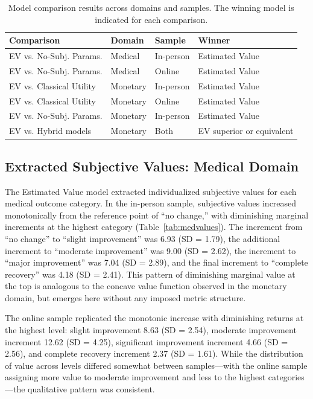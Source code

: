 \documentclass[12pt]{article}
\begin{document}
\begin{table}[ht]
\centering
\caption{Model comparison results across domains and samples. The winning model is indicated for each comparison.}
\label{tab:modelcomp}
\begin{tabular}{llll}
\toprule
Comparison & Domain & Sample & Winner \\
\midrule
EV vs. No-Subj. Params. & Medical & In-person & Estimated Value \\
EV vs. No-Subj. Params. & Medical & Online & Estimated Value \\
EV vs. Classical Utility & Monetary & In-person & Estimated Value \\
EV vs. Classical Utility & Monetary & Online & Estimated Value \\
EV vs. No-Subj. Params. & Monetary & In-person & Estimated Value \\
EV vs. Hybrid models & Monetary & Both & EV superior or equivalent \\
\bottomrule
\end{tabular}
\end{table}

\subsection{Extracted Subjective Values: Medical Domain}

The Estimated Value model extracted individualized subjective values for each medical outcome category. In the in-person sample, subjective values increased monotonically from the reference point of ``no change,'' with diminishing marginal increments at the highest category (Table~\ref{tab:medvalues}). The increment from ``no change'' to ``slight improvement'' was 6.93 (SD = 1.79), the additional increment to ``moderate improvement'' was 9.00 (SD = 2.62), the increment to ``major improvement'' was 7.04 (SD = 2.89), and the final increment to ``complete recovery'' was 4.18 (SD = 2.41). This pattern of diminishing marginal value at the top is analogous to the concave value function observed in the monetary domain, but emerges here without any imposed metric structure.

The online sample replicated the monotonic increase with diminishing returns at the highest level: slight improvement 8.63 (SD = 2.54), moderate improvement increment 12.62 (SD = 4.25), significant improvement increment 4.66 (SD = 2.56), and complete recovery increment 2.37 (SD = 1.61). While the distribution of value across levels differed somewhat between samples---with the online sample assigning more value to moderate improvement and less to the highest categories---the qualitative pattern was consistent.
\end{document}
